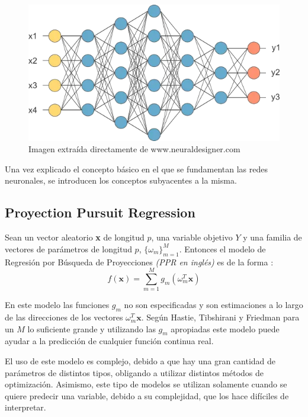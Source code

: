 \begin{figure}[h]
\centering
\includegraphics[scale=0.45]{Documentos Extra/red-neuronal-grande.png}
\caption{Imagen extraída directamente de www.neuraldesigner.com}
\end{figure}

\noindent Una vez explicado el concepto básico en el que se fundamentan las redes neuronales, se introducen los conceptos subyacentes a la misma.  

\subsection{Proyection Pursuit Regression}

\noindent Sean un vector aleatorio \textbf{x} de longitud $p$, una variable objetivo $Y$ y una familia de vectores de parámetros de longitud $p$, $\lbrace \omega_m\rbrace_{m=1}^M$. Entonces el modelo de Regresión por Búsqueda de Proyecciones \textit{(PPR en inglés)} es de la forma :
\begin{equation}
f(\textbf{x})=\sum_{m=1}^M g_m(\omega_m^T \textbf{x})
\end{equation}

\noindent En este modelo las funciones $g_m$ no son especificadas y son estimaciones a lo largo de las direcciones de los vectores $\omega_m^T \textbf{x}$. Según Hastie, Tibshirani y Friedman \cite{Hastie 2001} para un $M$ lo suficiente grande y utilizando las $g_m$ apropiadas este modelo puede ayudar a la predicción de cualquier función continua real. 


\noindent El uso de este modelo es complejo, debido a que hay una gran cantidad de parámetros de distintos tipos, obligando a utilizar distintos métodos de optimización. Asimismo, este tipo de modelos se utilizan solamente cuando se quiere predecir una variable, debido a su complejidad, que los hace difíciles de interpretar.

